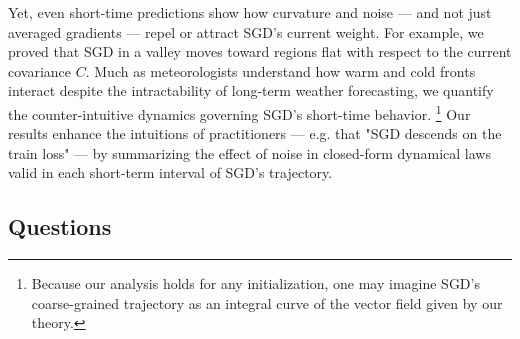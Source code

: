 \documentclass{article}
\theoremstyle{plain}
\theoremstyle{definition}
\begin{document}
        Yet, even short-time predictions show how curvature and noise --- and
        not just averaged gradients --- repel or attract SGD's current weight.
        For example, we proved that SGD in a valley moves toward regions flat
        with respect to the current covariance $C$.  Much as meteorologists
        understand how warm and cold fronts interact despite the intractability
        of long-term weather forecasting, we quantify the counter-intuitive
        dynamics governing SGD's short-time behavior.%
        \footnote{
            Because our analysis holds for any initialization, one may imagine
            SGD's coarse-grained trajectory as an integral curve of the vector
            field given by our theory.
        }
        Our results enhance the intuitions of practitioners --- e.g. that "SGD
        descends on the train loss" --- by summarizing the effect of noise in
        closed-form dynamical laws valid in each short-term interval of SGD's
        trajectory.

    \subsection{Questions}

\end{document}
